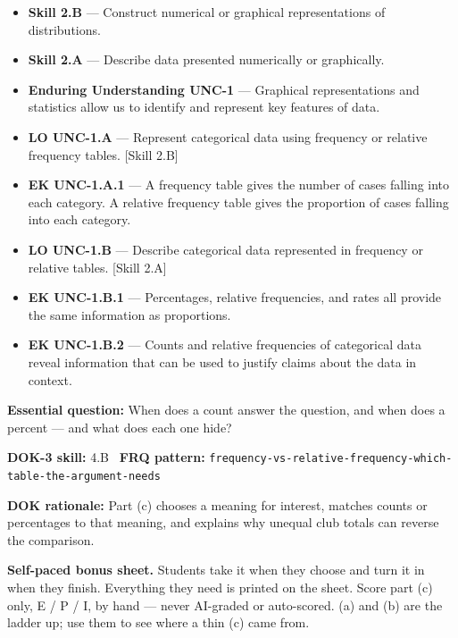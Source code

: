 \documentclass[11pt]{article}
\begin{document}


{\small
\begin{itemize}[leftmargin=1.5em,itemsep=2pt,topsep=2pt]
  \item \textbf{Skill 2.B} --- Construct numerical or graphical representations of distributions.
  \item \textbf{Skill 2.A} --- Describe data presented numerically or graphically.
  \item \textbf{Enduring Understanding UNC-1} --- Graphical representations and statistics allow us to identify and represent key features of data.
  \item \textbf{LO UNC-1.A} --- Represent categorical data using frequency or relative frequency tables. [Skill 2.B]
  \item \textbf{EK UNC-1.A.1} --- A frequency table gives the number of cases falling into each category. A relative frequency table gives the proportion of cases falling into each category.
  \item \textbf{LO UNC-1.B} --- Describe categorical data represented in frequency or relative tables. [Skill 2.A]
  \item \textbf{EK UNC-1.B.1} --- Percentages, relative frequencies, and rates all provide the same information as proportions.
  \item \textbf{EK UNC-1.B.2} --- Counts and relative frequencies of categorical data reveal information that can be used to justify claims about the data in context.
\end{itemize}
}
\textbf{Essential question:} When does a count answer the question, and when does a percent --- and what does each one hide?\par
\textbf{DOK-3 skill:} 4.B \textperiodcentered\ \textbf{FRQ pattern:} {\small\texttt{frequency-\allowbreak{}vs-\allowbreak{}relative-\allowbreak{}frequency-\allowbreak{}which-\allowbreak{}table-\allowbreak{}the-\allowbreak{}argument-\allowbreak{}needs}}\par
\textbf{DOK rationale:} Part (c) chooses a meaning for interest, matches counts or percentages to that meaning, and explains why unequal club totals can reverse the comparison.\par

\textbf{Self-paced bonus sheet.} Students take it when they choose and turn it in when they finish. Everything they need is printed on the sheet. Score part (c) only, E / P / I, by hand --- never AI-graded or auto-scored. (a) and (b) are the ladder up; use them to see where a thin (c) came from.\par
\end{document}
